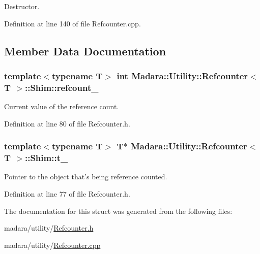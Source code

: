 Destructor. 



Definition at line 140 of file Refcounter.cpp.



\subsection{Member Data Documentation}
\hypertarget{structMadara_1_1Utility_1_1Refcounter_1_1Shim_a189dbf593317e1844f01375a6b0e702d}{
\subsubsection[{refcount\_\-}]{\setlength{\rightskip}{0pt plus 5cm}template$<$typename T$>$ int {\bf Madara::Utility::Refcounter}$<$ T $>$::{\bf Shim::refcount\_\-}}}
\label{d9/d46/structMadara_1_1Utility_1_1Refcounter_1_1Shim_a189dbf593317e1844f01375a6b0e702d}


Current value of the reference count. 



Definition at line 80 of file Refcounter.h.

\hypertarget{structMadara_1_1Utility_1_1Refcounter_1_1Shim_a5d947b2e53f84757eb6f307ceeb72312}{
\subsubsection[{t\_\-}]{\setlength{\rightskip}{0pt plus 5cm}template$<$typename T$>$ T$\ast$ {\bf Madara::Utility::Refcounter}$<$ T $>$::{\bf Shim::t\_\-}}}
\label{d9/d46/structMadara_1_1Utility_1_1Refcounter_1_1Shim_a5d947b2e53f84757eb6f307ceeb72312}


Pointer to the object that's being reference counted. 



Definition at line 77 of file Refcounter.h.



The documentation for this struct was generated from the following files:\begin{DoxyCompactItemize}
\item 
madara/utility/\hyperlink{Refcounter_8h}{Refcounter.h}\item 
madara/utility/\hyperlink{Refcounter_8cpp}{Refcounter.cpp}\end{DoxyCompactItemize}
